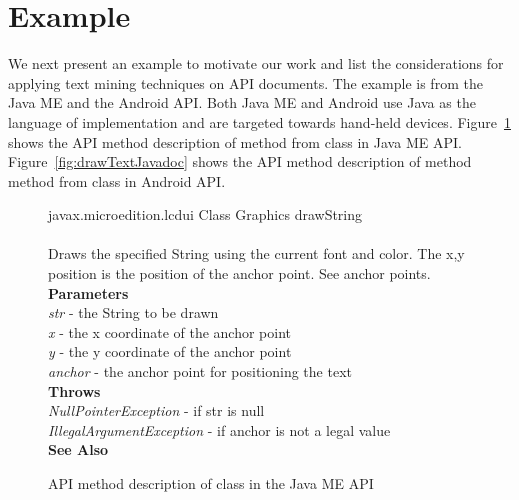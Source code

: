 \section{Example}
\label{sec:example}

We next present an example to motivate our work and list the considerations for applying text mining techniques on API documents. 
The example is from the Java ME and the Android API. Both Java ME and Android use Java as the language of implementation and are targeted towards hand-held devices.
Figure~\ref{fig:drawStringJavadoc} shows the API method description
of  method from
 class in Java ME API.
Figure~\ref{fig:drawTextJavadoc} shows the API method description
of method  method from
 class in Android API.

\begin{figure}
	\begin{framed}
		\begin{small}
			{\small javax.microedition.lcdui} {\normalsize Class Graphics} {\large drawString}\\
			\\
			Draws the specified String using the current font and color. The x,y position is the position of the anchor point. See anchor points.\\
			\textbf{Parameters}\\
			\textit{str} - the String to be drawn\\
			\textit{x} - the x coordinate of the anchor point\\
			\textit{y} - the y coordinate of the anchor point\\
			\textit{anchor} - the anchor point for positioning the text\\
			\textbf{Throws}\\
			\textit{NullPointerException} - if str is null\\
			\textit{IllegalArgumentException} - if anchor is not a legal value\\
			\textbf{See Also}\\
		\end{small}
	\end{framed}
	\vspace{-2ex}
	\caption{ API method description of  class in the Java ME API}
	\label{fig:drawStringJavadoc}
	\vspace*{-2ex}
\end{figure}


